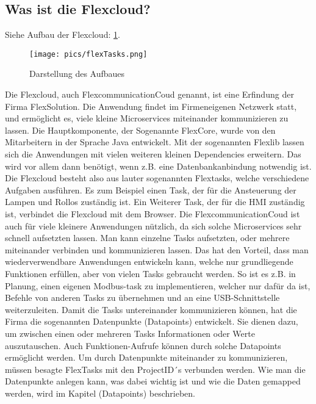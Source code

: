 \subsection{Was ist die Flexcloud?}

Siehe Aufbau der Flexcloud: \ref{fig:impl:FlexcloudAnsicht}.

  \begin{figure}[h t]
    \centering
    \texttt{[image: pics/flexTasks.png]}
    \caption{Darstellung des Aufbaues}
    \label{fig:impl:FlexcloudAnsicht}
\end{figure}

Die Flexcloud, auch FlexcommunicationCoud genannt, ist eine Erfindung der Firma FlexSolution. Die Anwendung findet im Firmeneigenen Netzwerk statt, und ermöglicht es, viele kleine Microservices miteinander kommunizieren zu lassen. Die Hauptkomponente, der Sogenannte FlexCore, wurde von den Mitarbeitern in der Sprache Java entwickelt. Mit der sogenannten Flexlib lassen sich die Anwendungen mit vielen weiteren kleinen Dependencies erweitern. Das wird vor allem dann benötigt, wenn z.B. eine Datenbankanbindung notwendig ist. Die Flexcloud besteht also aus lauter sogenannten Flextasks, welche verschiedene Aufgaben ausführen. Es zum Beispiel einen Task, der für die Ansteuerung der Lampen und Rollos zuständig ist. Ein Weiterer Task, der für die HMI zuständig ist, verbindet die Flexcloud mit dem Browser. Die FlexcommunicationCoud ist auch für viele kleinere Anwendungen nützlich, da sich solche Microservices sehr schnell aufsetzten lassen. Man kann einzelne Tasks aufsetzten, oder mehrere miteinander verbinden und kommunizieren lassen. Das hat den Vorteil, dass man wiederverwendbare Anwendungen entwickeln kann, welche nur grundliegende Funktionen erfüllen, aber von vielen Tasks gebraucht werden. So ist es z.B. in Planung, einen eigenen Modbus-task zu implementieren, welcher nur dafür da ist, Befehle von anderen Tasks zu übernehmen und an eine USB-Schnittstelle weiterzuleiten. Damit die Tasks untereinander kommunizieren können, hat die Firma die sogenannten Datenpunkte (Datapoints) entwickelt. Sie dienen dazu, um zwischen einen oder mehreren Tasks Informationen oder Werte auszutauschen. Auch Funktionen-Aufrufe können durch solche Datapoints ermöglicht werden. Um durch Datenpunkte miteinander zu kommunizieren, müssen besagte FlexTasks mit den ProjectID´s verbunden werden. Wie man die Datenpunkte anlegen kann, was dabei wichtig ist und wie die Daten gemapped werden, wird im Kapitel (Datapoints) beschrieben. 

